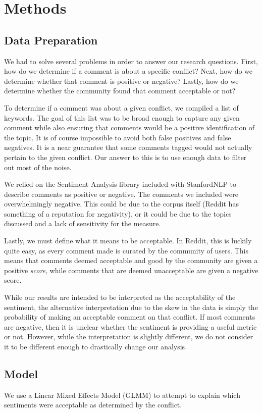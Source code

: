 \section{Methods}
\subsection{Data Preparation}
We had to solve several problems in order to answer our research questions. First, how do we determine if a comment is about a specific conflict? Next, how do we determine whether that comment is positive or negative? Lastly, how do we determine whether the community found that comment acceptable or not?

To determine if a comment was about a given conflict, we compiled a list of keywords. The goal of this list was to be broad enough to capture any given comment while also ensuring that comments would be a positive identification of the topic. It is of course impossible to avoid both false positives and false negatives. It is a near guarantee that some comments tagged would not actually pertain to the given conflict. Our answer to this is to use enough data to filter out most of the noise.

We relied on the Sentiment Analysis library included with StanfordNLP to describe comments as positive or negative. The comments we included were overwhelmingly negative. This could be due to the corpus itself (Reddit has something of a reputation for negativity), or it could be due to the topics discussed and a lack of sensitivity for the measure. 

Lastly, we must define what it means to be acceptable. In Reddit, this is luckily quite easy, as every comment made is curated by the community of users. This means that comments deemed acceptable and good by the community are given a positive \textit{score}, while comments that are deemed unacceptable are given a negative score. 

While our results are intended to be interpreted as the acceptability of the sentiment, the alternative interpretation due to the skew in the data is simply the probability of making an acceptable comment on that conflict. If most comments are negative, then it is unclear whether the sentiment is providing a useful metric or not. However, while the interpretation is slightly different, we do not consider it to be different enough to drastically change our analysis.

\subsection{Model}
We use a Linear Mixed Effects Model (GLMM) to attempt to explain which sentiments were acceptable as determined by the conflict.

